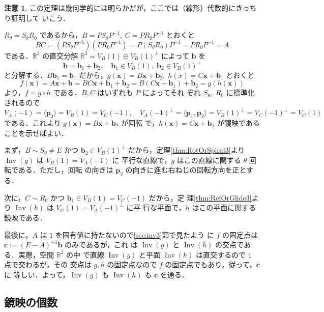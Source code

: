 \documentclass[11pt, uplatex, dvipdfmx, titlepage]{jsarticle}
\makeatletter
\DeclareMathOperator{\Inv}{Inv}
\renewenvironment{proof}[1][\proofname]{\par
  \pushQED{\qed}%
  \normalfont \topsep6\p@\@plus6\p@\relax
  \trivlist
  \item[\hskip\labelsep
         \bfseries
    {#1}]\ignorespaces
}{%
  \popQED\endtrivlist\@endpefalse
}
\theoremstyle{definition}
\renewcommand{\proofname}{\textbf{証明}}
\newtheorem*{remark}{注意}
\makeatother
\begin{document}
\begin{remark}
  この定理は幾何学的には明らかだが，ここでは（線形）代数的にきっちり証明して
  いこう．  
\end{remark}

\begin{proof}
$R_{\theta}=S_{\theta}R_{0}$ であるから，$B=PS_{\theta}P^{-1}, \; C=PR_{0}P^{-1}$ とおくと
\[
  BC = \left(PS_{\theta}P^{-1}\right)\left(PR_{0}P^{-1}\right) = P
  \left( S_{\theta}R_{0}\right)P^{-1} = P R_{\theta} P^{-1}=A
\]
である．$\mathbb{R}^3$ の直交分解 $\mathbb{R}^3 = V_B(1) \oplus
V_B(1)^{\perp}$ によって $\bm{b}$ を
\[
  \bm{b}=\bm{b}_{1} + \bm{b}_{2}, \quad \bm{b}_{1} \in
  V_B(1), \; \bm{b}_2 \in V_B(1)^{\perp}
\]
と分解する．$B \bm{b}_1 = \bm{b}_1$
だから，$g(\bm{x}) = B\bm{x} + \bm{b}_{2}, \; h(x) = C\bm{x}+\bm{b}_1$
とおくと
\[
  f(\bm{x}) = A\bm{x} + \bm{b} = BC\bm{x}+\bm{b}_{1}+\bm{b}_{2} =
  B\left(C\bm{x}+\bm{b}_{1}\right) + \bm{b}_{2} = g(h(\bm{x}))
\]
より，$f= g \circ h$ である．$B, C$ はいずれも $P$ によってそれ
ぞれ $S_{\theta}, \; R_0$ に標準化されるので
\[
  V_A(-1) = \langle \bm{p}_3 \rangle = V_B(1)=V_C(-1), \quad
  V_A(-1)^{\perp} = \langle \bm{p}_1, \bm{p}_2\rangle = V_B(1)^{\perp}
  = V_C(-1)^{\perp}=V_C(1)
\]
である．これより $g(\bm{x})=B\bm{x}+\bm{b}_2$ が回転
で，$h(\bm{x})=C\bm{x}+\bm{b}_1$ が鏡映であることを示せばよい．


まず，$B \sim S_{\theta} \neq E$ かつ $\bm{b}_{2} \in V_B(1)^{\perp}$
だから，定理\ref{thm:RotOrSpiral3}より $\Inv(g)$ は $V_B(1)=V_A(-1)$ に
平行な直線で，$g$ はこの直線に関する $\theta$ 回転である．ただし，回転
の向きは $\bm{p}_3$ の向きに進む右ねじの回転方向を正とする．

次に，$C \sim R_0$ かつ $\bm{b}_1 \in V_B(1)=V_C(-1)$ だから，定
理\ref{thm:RefOrGlide3}より $\Inv(h)$ は $V_C(1)=V_A(-1)^{\perp}$ に平
行な平面で，$h$ はこの平面に関する鏡映である．

最後に，$A$ は $1$ を固有値に持たないので\ref{sec:inv3}節で見たよう
に $f$ の固定点は $\bm{c}:=(E-A)^{-1}\bm{b}$ のみであるが，これ
は $\Inv(g)$ と $\Inv(h)$ の交点である．実際，空間 $\mathbb{R}^3$ の中
で直線 $\Inv(g)$ と平面 $\Inv(h)$ は直交するので $1$ 点で交わるが，その
交点は $g, h$ の固定点なので $f$ の固定点でもあり，従って，$\bm{c}$ に
等しい．よって，$\Inv(g)$ も $\Inv(h)$ も $\bm{c}$ を通る．
\end{proof}


\subsection{鏡映の個数}
\end{document}
